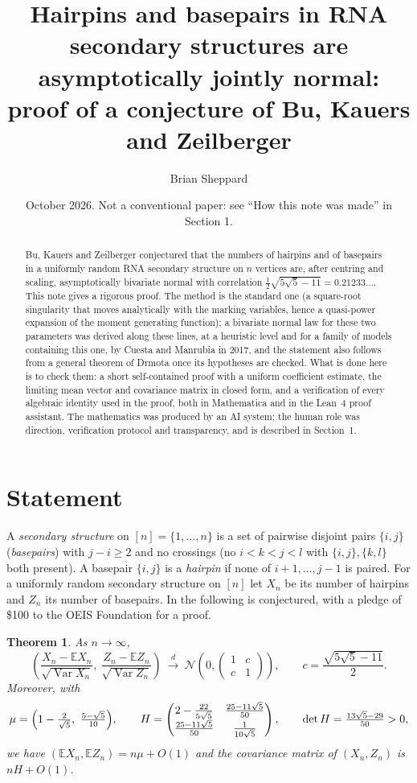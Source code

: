\documentclass[11pt]{amsart}
\title[Hairpins and basepairs are jointly normal]{Hairpins and basepairs in RNA secondary structures are asymptotically jointly normal: proof of a conjecture of Bu, Kauers and Zeilberger}
\author{Brian Sheppard}
\date{October 2026. Not a conventional paper: see ``How this note was made'' in Section 1.}
\newtheorem{theorem}{Theorem}
\theoremstyle{remark}
\newcommand{\E}{\mathbb{E}}
\newcommand{\Var}{\operatorname{Var}}
\begin{document}
\begin{abstract}
Bu, Kauers and Zeilberger conjectured that the numbers of hairpins and of basepairs in a uniformly random
RNA secondary structure on $n$ vertices are, after centring and scaling, asymptotically bivariate normal with
correlation $\tfrac12\sqrt{5\sqrt5-11}=0.21233\ldots$. This note gives a rigorous proof. The method is the standard one
(a square-root singularity that moves analytically with the marking variables, hence a quasi-power expansion of
the moment generating function); a bivariate normal law for these two parameters was derived along these lines, at
a heuristic level and for a family of models containing this one, by Cuesta and Manrubia in 2017, and the statement
also follows from a general theorem of Drmota once its hypotheses are checked. What is done here is to check them:
a short self-contained proof with a uniform coefficient estimate, the limiting mean vector and covariance matrix in
closed form, and a verification of every algebraic identity used in the proof, both in Mathematica and in the Lean~4 proof
assistant. The mathematics was produced by an AI system; the human role was direction, verification protocol and
transparency, and is described in Section~1.
\end{abstract}
\maketitle

\section{Statement}
A \emph{secondary structure} on $[n]=\{1,\dots,n\}$ is a set of pairwise disjoint pairs $\{i,j\}$
(\emph{basepairs}) with $j-i\ge 2$ and no crossings (no $i<k<j<l$ with $\{i,j\},\{k,l\}$ both present).
A basepair $\{i,j\}$ is a \emph{hairpin} if none of $i+1,\dots,j-1$ is paired. For a uniformly random secondary
structure on $[n]$ let $X_n$ be its number of hairpins and $Z_n$ its number of basepairs.
In \cite{BKZ} the following is conjectured, with a pledge of \$100 to the OEIS Foundation for a proof.

\begin{theorem}\label{main}
As $n\to\infty$,
\[
\left(\frac{X_n-\E X_n}{\sqrt{\Var X_n}},\ \frac{Z_n-\E Z_n}{\sqrt{\Var Z_n}}\right)\ \xrightarrow{\ d\ }\
\mathcal N\!\left(0,\begin{pmatrix}1&c\\ c&1\end{pmatrix}\right),\qquad c=\frac{\sqrt{5\sqrt5-11}}{2}.
\]
Moreover, with
\[
\mu=\Bigl(1-\tfrac{2}{\sqrt5},\ \tfrac{5-\sqrt5}{10}\Bigr),\qquad
H=\begin{pmatrix} 2-\frac{22}{5\sqrt5} & \frac{25-11\sqrt5}{50}\\[2pt] \frac{25-11\sqrt5}{50} & \frac{1}{10\sqrt5}\end{pmatrix},
\qquad \det H=\tfrac{13\sqrt5-29}{50}>0,
\]
we have $(\E X_n,\E Z_n)=n\mu+O(1)$ and the covariance matrix of $(X_n,Z_n)$ is $nH+O(1)$.
\end{theorem}
\end{document}
